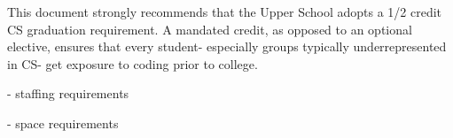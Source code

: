 

 \par
This document strongly recommends that the Upper School adopts a 1/2 credit CS graduation requirement. A mandated credit, as opposed to an optional elective, ensures that every student- especially groups typically underrepresented in CS- get exposure to coding prior to college. \par


- staffing requirements \par
- space requirements \par